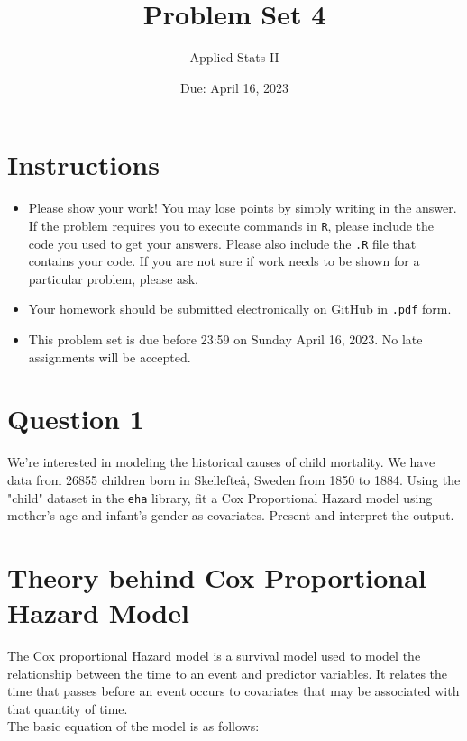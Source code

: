 \documentclass[12pt,letterpaper]{article}
\title{Problem Set 4}
\date{Due: April 16, 2023}
\author{Applied Stats II}
\begin{document}
	\maketitle
	\section*{Instructions}
	\begin{itemize}
	\item Please show your work! You may lose points by simply writing in the answer. If the problem requires you to execute commands in \texttt{R}, please include the code you used to get your answers. Please also include the \texttt{.R} file that contains your code. If you are not sure if work needs to be shown for a particular problem, please ask.
	\item Your homework should be submitted electronically on GitHub in \texttt{.pdf} form.
	\item This problem set is due before 23:59 on Sunday April 16, 2023. No late assignments will be accepted.

	\end{itemize}

	\vspace{.25cm}
\section*{Question 1}
\vspace{.25cm}
\noindent We're interested in modeling the historical causes of child mortality. We have data from 26855 children born in Skellefteå, Sweden from 1850 to 1884. Using the "child" dataset in the \texttt{eha} library, fit a Cox Proportional Hazard model using mother's age and infant's gender as covariates. Present and interpret the output.


\newpage

\section{Theory behind Cox Proportional Hazard Model}

\noindent The Cox proportional Hazard model is a survival model used to model the relationship between the time to an event and predictor variables. It relates the time that passes before an event occurs to covariates that may be associated with that quantity of time. 
\\

\noindent The basic equation of the model is as follows:
\end{document}
